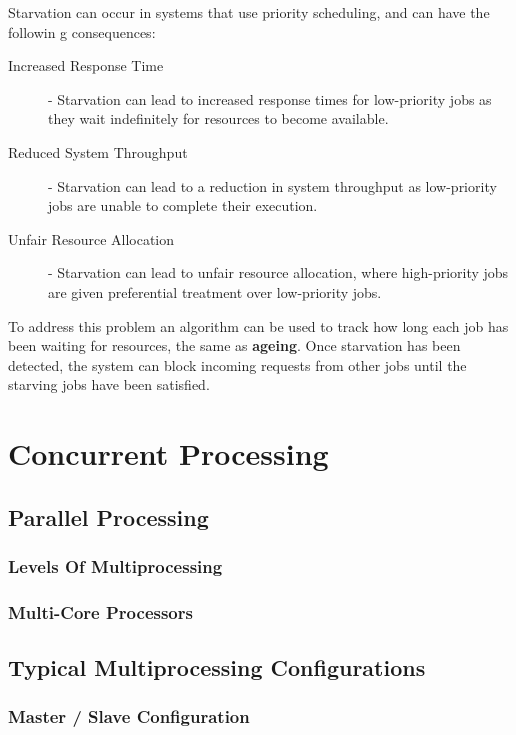 \documentclass[12pt letter]{report}
\begin{document}

Starvation can occur in systems that use priority scheduling, and can
have the followin g consequences:
\begin{description}
  \item[Increased Response Time] - Starvation can lead to increased
    response times for low-priority jobs as they wait indefinitely
    for resources to become available.
  \item[Reduced System Throughput] - Starvation can lead to a
    reduction in system throughput as low-priority jobs are unable to
    complete their execution.
  \item[Unfair Resource Allocation] - Starvation can lead to unfair
    resource allocation, where high-priority jobs are given
    preferential treatment over low-priority jobs.
\end{description}

To address this problem an algorithm can be used to track how long
each job has been waiting for resources, the same as \textbf{ageing}.
Once starvation has been detected, the system can block incoming
requests from other jobs until the starving jobs have been satisfied.

\chapter{Concurrent Processing}

\section{Parallel Processing}

\subsection{Levels Of Multiprocessing}

\subsection{Multi-Core Processors}

\section{Typical Multiprocessing Configurations}

\subsection{Master / Slave Configuration}
\end{document}
